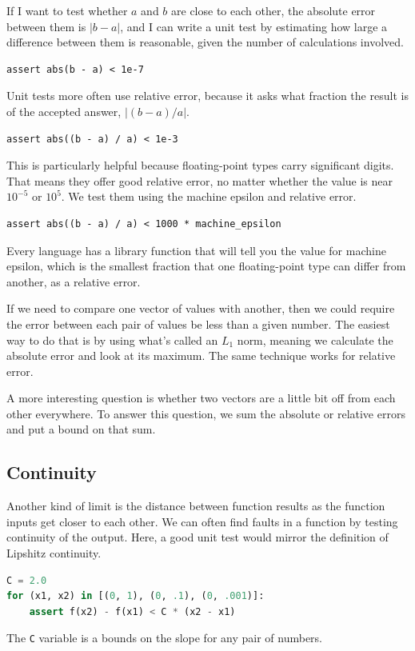\documentclass[fleqn,10pt]{olplainarticle}
\begin{document}
If I want to test whether $a$ and $b$ are close to each other,
the absolute error between them is $|b-a|$, and I can write a unit
test by estimating how large a difference between them is reasonable,
given the number of calculations involved.
\begin{lstlisting}
assert abs(b - a) < 1e-7
\end{lstlisting}
Unit tests more often use relative error, because it asks what
fraction the result is of the accepted answer, $|(b - a) / a|$.
\begin{lstlisting}
assert abs((b - a) / a) < 1e-3
\end{lstlisting}
This is particularly helpful because floating-point types carry
significant digits. That means they offer good relative error,
no matter whether the value is near $10^{-5}$ or $10^5$. We test
them using the machine epsilon and relative error.
\begin{lstlisting}
assert abs((b - a) / a) < 1000 * machine_epsilon
\end{lstlisting}
Every language has a library function that will tell you the
value for machine epsilon, which is the smallest fraction that
one floating-point type can differ from another, as a relative
error.

If we need to compare one vector of values with another, then
we could require the error between each pair of values be less
than a given number. The easiest way to do that is by using
what's called an $L_1$ norm, meaning we calculate the absolute error and
look at its maximum. The same technique works for relative error.

A more interesting question is whether two vectors are a little
bit off from each other everywhere. To answer this question,
we sum the absolute or relative errors and put a bound on that
sum. 


\subsection{Continuity}

Another kind of limit is the distance between function results
as the function inputs get closer to each other. We can often
find faults in a function by testing continuity of the output.
Here, a good unit test would mirror the definition of Lipshitz continuity.
\begin{lstlisting}[language=python]
C = 2.0
for (x1, x2) in [(0, 1), (0, .1), (0, .001)]:
    assert f(x2) - f(x1) < C * (x2 - x1)
\end{lstlisting}
The \lstinline!C! variable is a bounds on the slope for any
pair of numbers.
\end{document}
